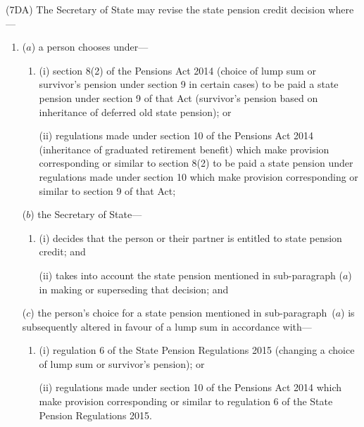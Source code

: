 \documentclass[12pt,a4paper]{article}
\begin{document}
(7DA) The Secretary of State may revise the state pension credit decision where—
\begin{enumerate}\item[]
($a$) a person chooses under—
\begin{enumerate}\item[]
(i) section 8(2) of the Pensions Act 2014 (choice of lump sum or survivor’s pension under section 9 in certain cases) to be paid a state pension under section 9 of that Act (survivor’s pension based on inheritance of deferred old state pension); or

(ii) regulations made under section 10 of the Pensions Act 2014 (inheritance of graduated retirement benefit) which make provision corresponding or similar to section 8(2) to be paid a state pension under regulations made under section 10 which make provision corresponding or similar to section 9 of that Act;
\end{enumerate}

($b$) the Secretary of State—
\begin{enumerate}\item[]
(i) decides that the person or their partner is entitled to state pension credit; and

(ii) takes into account the state pension mentioned in sub-paragraph ($a$) in making or superseding that decision; and
\end{enumerate}

\begin{sloppypar}
($c$) the person’s choice for a state pension mentioned in sub-paragraph~($a$) is subsequently altered in favour of a lump sum in accordance with—
\end{sloppypar}
\begin{enumerate}\item[]
(i) regulation 6 of the State Pension Regulations 2015 (changing a choice of lump sum or survivor’s pension); or

(ii) regulations made under section 10 of the Pensions Act 2014 which make provision corresponding or similar to regulation 6 of the State Pension Regulations 2015.
\end{enumerate}
\end{enumerate}
\end{document}
